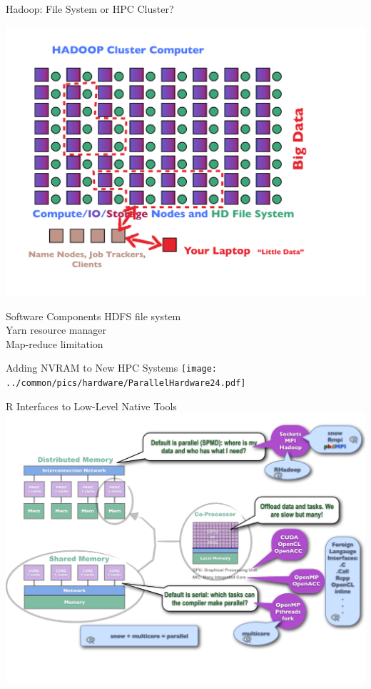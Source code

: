 \begin{frame}{Hadoop: File System or HPC Cluster?}
\begin{minipage}{8.5cm}
  \includegraphics[trim=2cm 0cm 0cm 0cm,clip=true,height=0.8\textheight]
  {../common/pics/hardware/ParallelHardware23.pdf}
\end{minipage}
\begin{minipage}{3cm}\small
  \begin{block}{Software Components}\pause
    \scriptsize HDFS file system\\
    Yarn resource manager \\
    Map-reduce limitation
  \end{block}
\end{minipage}
\end{frame}

\begin{frame}{Adding NVRAM to New HPC Systems}
\texttt{[image: ../common/pics/hardware/ParallelHardware24.pdf]}
\end{frame}

\begin{frame}{R Interfaces to Low-Level Native Tools}
\includegraphics[height=\textheight]
{../common/pics/hardware/ParallelHardware10.pdf}
\end{frame}

